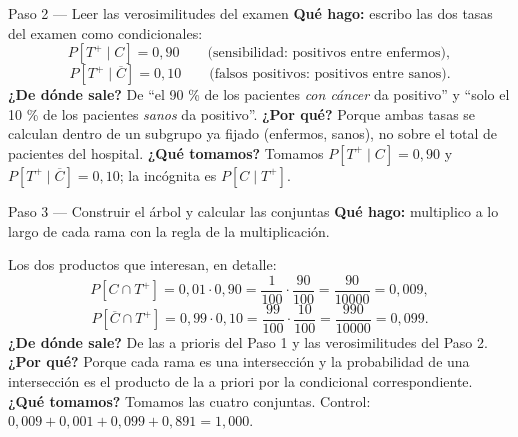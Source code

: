 \documentclass[11pt]{article}
\begin{document}
\begin{sol}
\begin{paso}{Paso 2 --- Leer las verosimilitudes del examen}
\textbf{Qu\'e hago:} escribo las dos tasas del examen como condicionales:
\[
P[T^{+}\mid C]=0{,}90
\qquad\text{(sensibilidad: positivos entre enfermos)},
\]
\[
P[T^{+}\mid \overline{C}]=0{,}10
\qquad\text{(falsos positivos: positivos entre sanos)}.
\]
\textbf{¿De d\'onde sale?} De ``el 90 \% de los pacientes \emph{con c\'ancer} da positivo'' y ``solo el 10 \% de los pacientes \emph{sanos} da positivo''.
\textbf{¿Por qu\'e?} Porque ambas tasas se calculan dentro de un subgrupo ya fijado (enfermos, sanos), no sobre el total de pacientes del hospital.
\textbf{¿Qu\'e tomamos?} Tomamos $P[T^{+}\mid C]=0{,}90$ y $P[T^{+}\mid\overline{C}]=0{,}10$; la inc\'ognita es $P[C\mid T^{+}]$.
\end{paso}

\begin{paso}{Paso 3 --- Construir el \'arbol y calcular las conjuntas}
\textbf{Qu\'e hago:} multiplico a lo largo de cada rama con la regla de la multiplicaci\'on.

\begin{center}
\shorthandoff{<>}
\shorthandon{<>}
\end{center}

Los dos productos que interesan, en detalle:
\[
P[C\cap T^{+}]=0{,}01\cdot 0{,}90=\frac{1}{100}\cdot\frac{90}{100}=\frac{90}{10000}=0{,}009,
\]
\[
P[\overline{C}\cap T^{+}]=0{,}99\cdot 0{,}10=\frac{99}{100}\cdot\frac{10}{100}=\frac{990}{10000}=0{,}099 .
\]
\textbf{¿De d\'onde sale?} De las a prioris del Paso 1 y las verosimilitudes del Paso 2.
\textbf{¿Por qu\'e?} Porque cada rama es una intersecci\'on y la probabilidad de una intersecci\'on es el producto de la a priori por la condicional correspondiente.
\textbf{¿Qu\'e tomamos?} Tomamos las cuatro conjuntas. Control: $0{,}009+0{,}001+0{,}099+0{,}891=1{,}000$.
\end{paso}


\end{sol}
\end{document}
